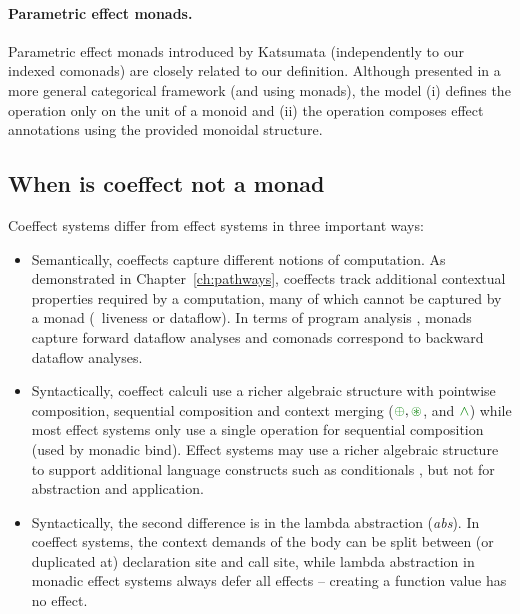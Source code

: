 \paragraph{Parametric effect monads.}
Parametric effect monads introduced by Katsumata \cite{monads-parametric} (independently to our
indexed comonads) are closely related to our definition.  Although presented in a more general
categorical framework (and using monads), the model (i) defines the  operation only on the
unit of a monoid and (ii) the  operation composes effect annotations using the provided
monoidal structure.

\subsection{When is coeffect not a monad}
\label{sec:semantics-related-monad}

Coeffect systems differ from effect systems in three important ways:

\begin{itemize}
\item Semantically, coeffects capture different notions of computation. As demonstrated in
  Chapter~\ref{ch:pathways}, coeffects track additional contextual properties required by a
  computation, many of which cannot be captured by a monad (\eg~liveness or dataflow).
  In terms of program analysis \cite{other-optcomp}, monads capture forward dataflow analyses and
  comonads correspond to backward dataflow analyses.

\item Syntactically, coeffect calculi use a richer algebraic structure with pointwise composition,
  sequential composition and context merging ($\cpar, \cseq$, and $\czip$) while most effect systems
  only use a single operation for sequential composition (used by monadic bind). Effect systems
  may use a richer algebraic structure to support additional language constructs such as conditionals
  \cite{effects-nielson,effects-revisited}, but not for abstraction and application.

\item Syntactically, the second difference is in the lambda abstraction (\emph{abs}). In
  coeffect systems, the context demands of the body can be split between (or duplicated
  at) declaration site and call site, while lambda abstraction in monadic effect systems always
  defer all effects -- creating a function value has no effect.
\end{itemize}

